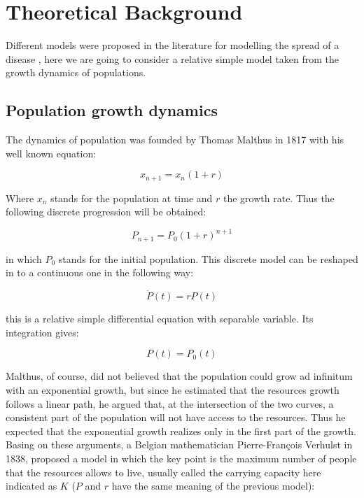 \documentclass[
12pt, %
a4paper, %
oneside, %
headinclude,footinclude, %
BCOR5mm, %
]{scrartcl}
\begin{document}

\section{Theoretical Background} \label{Theoretical Background}
Different models were proposed in the literature for modelling the spread of a disease \cite{keeling2011modeling}, here we are going to consider a relative simple model taken from the growth dynamics of populations.

\subsection{Population growth dynamics}
The dynamics of population was founded by Thomas Malthus in 1817 \cite{malthus1817essay} with his well known equation: 

\begin{equation}
x_{n+1}=x_{n}(1+r)
\end{equation}

Where $x_{n}$ stands for the population at time and $r$ the growth rate. Thus the following discrete progression will be obtained: 

\begin{equation}
P_{n+1}=P_{0}(1+r)^{n+1}
\end{equation}

in which $P_{0}$ stands for the initial population. This discrete model can be reshaped in to a continuous one in the following way: 

\begin{equation}
\dot{P}(t)=rP(t)
\end{equation}

this is a relative simple differential equation with separable variable. Its integration gives:

\begin{equation}
P(t)=P_{0}(t)
\end{equation}

Malthus, of course, did not believed that the population could grow ad infinitum with an exponential growth, but since he estimated that the resources growth follows a linear path, he argued that, at the intersection of the two curves, a consistent part of the population will not have access to the resources. Thus  he expected that the exponential growth realizes only in the first part of the growth. Basing on these arguments, a Belgian mathematician Pierre-François Verhulst in 1838, proposed a model \cite{verhulst1838notice} in which the key point is the maximum number of people that the resources allows to live, usually called the carrying capacity here indicated as $K$ ($P$ and $r$ have the same meaning of the previous model):
\end{document}
